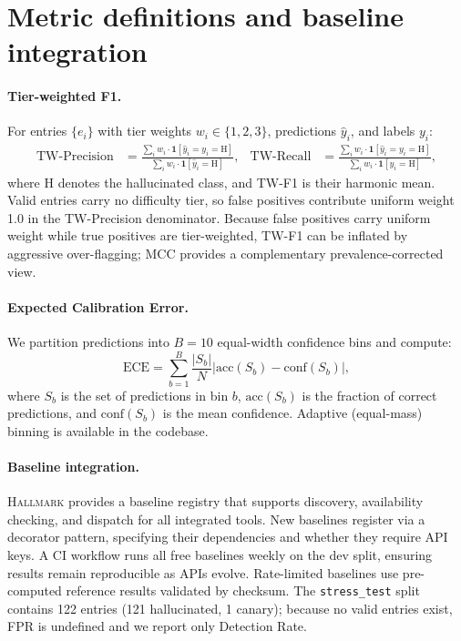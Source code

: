 \section{Metric definitions and baseline integration}
\label{app:metric_details}

\paragraph{Tier-weighted F1.}
For entries $\{e_i\}$ with tier weights $w_i \in \{1,2,3\}$, predictions $\hat{y}_i$, and labels $y_i$:
\begin{align}
\text{TW-Precision} &= \frac{\sum_i w_i \cdot \mathbf{1}[\hat{y}_i = y_i = \text{H}]}{\sum_i w_i \cdot \mathbf{1}[\hat{y}_i = \text{H}]}, &
\text{TW-Recall} &= \frac{\sum_i w_i \cdot \mathbf{1}[\hat{y}_i = y_i = \text{H}]}{\sum_i w_i \cdot \mathbf{1}[y_i = \text{H}]}, \label{eq:twf1}
\end{align}
where H denotes the hallucinated class, and TW-F1 is their harmonic mean.
Valid entries carry no difficulty tier, so false positives contribute uniform weight 1.0 in the TW-Precision denominator.
Because false positives carry uniform weight while true positives are tier-weighted, TW-F1 can be inflated by aggressive over-flagging; MCC provides a complementary prevalence-corrected view.

\paragraph{Expected Calibration Error.}
We partition predictions into $B=10$ equal-width confidence bins and compute:
\begin{equation}
\text{ECE} = \sum_{b=1}^{B} \frac{|S_b|}{N} \left| \text{acc}(S_b) - \text{conf}(S_b) \right|, \label{eq:ece}
\end{equation}
where $S_b$ is the set of predictions in bin $b$, $\text{acc}(S_b)$ is the fraction of correct predictions, and $\text{conf}(S_b)$ is the mean confidence.
Adaptive (equal-mass) binning is available in the codebase.

\paragraph{Baseline integration.}
\textsc{Hallmark} provides a baseline registry that supports discovery, availability checking, and dispatch for all integrated tools.
New baselines register via a decorator pattern, specifying their dependencies and whether they require API keys.
A CI workflow runs all free baselines weekly on the dev split, ensuring results remain reproducible as APIs evolve.
Rate-limited baselines use pre-computed reference results validated by checksum.
The \texttt{stress\_test} split contains 122 entries (121 hallucinated, 1 canary); because no valid entries exist, FPR is undefined and we report only Detection Rate.

